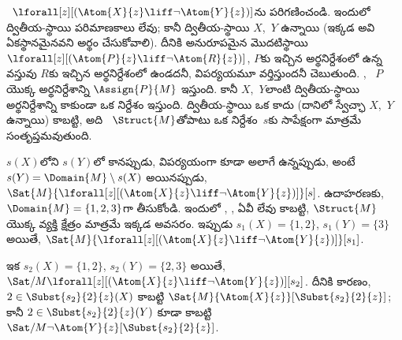 \documentclass[../../../include/open-logic-section]{subfiles}
\begin{document}
\begin{ex}
  ~$\lforall[z][(\Atom{X}{z} \liff \lnot
    \Atom{Y}{z})]$ను పరిగణించండి. ఇందులో ద్వితీయ-స్థాయి పరిమాణకాలు
  లేవు; కానీ ద్వితీయ-స్థాయి  $X$,~$Y$ ఉన్నాయి (ఇక్కడ అవి
  ఏకస్థానమైనవని అర్థం చేసుకోవాలి). దీనికి అనురూపమైన మొదటిస్థాయి
   $\lforall[z][(\Atom{P}{z} \liff \lnot \Atom{R}{z})]$,
$P$కు ఇచ్చిన అర్థనిర్దేశంలో ఉన్న వస్తువు $R$కు ఇచ్చిన అర్థనిర్దేశంలో
ఉండదనీ, విపర్యయమూ వర్తిస్తుందనీ చెబుతుంది.
  , ~$P$ యొక్క అర్థనిర్దేశాన్ని
  $\Assign{P}{M}$ ఇస్తుంది. కానీ $X$,~$Y$లాంటి ద్వితీయ-స్థాయి
   అర్థనిర్దేశాన్ని  కాకుండా ఒక  నిర్దేశం
  ఇస్తుంది. ద్వితీయ-స్థాయి  ఒక  కాదు (దానిలో
  స్వేచ్ఛా  $X$,~$Y$ ఉన్నాయి) కాబట్టి, అది
  ~$\Struct{M}$తోపాటు ఒక  నిర్దేశం~$s$కు
  సాపేక్షంగా మాత్రమే సంతృప్తమవుతుంది.

  $s(X)$లోని  $s(Y)$లో  కానప్పుడు,
  విపర్యయంగా కూడా అలాగే ఉన్నప్పుడు, అంటే $s(Y) = \Domain{M}
  \setminus s(X)$ అయినప్పుడు, $\Sat{M}{\lforall[z][(\Atom{X}{z}
  \liff \lnot \Atom{Y}{z})]}[s]$. ఉదాహరణకు, $\Domain{M} = \{1,
  2, 3\}$గా తీసుకోండి. ఇందులో , ,
   ఏవీ లేవు కాబట్టి, $\Struct{M}$ యొక్క వ్యక్తి క్షేత్రం
  మాత్రమే ఇక్కడ అవసరం. ఇప్పుడు $s_1(X) = \{1, 2\}$,
  $s_1(Y) = \{3\}$ అయితే, $\Sat{M}{\lforall[z][(\Atom{X}{z}
      \liff \lnot \Atom{Y}{z})]}[s_1]$.

ఇక $s_2(X) = \{1, 2\}$, $s_2(Y) = \{2, 3\}$ అయితే,
  $\Sat/{M}{\lforall[z][(\Atom{X}{z} \liff \lnot
      \Atom{Y}{z})]}[s_2]$. దీనికి కారణం,
  $2 \in \Subst{s_2}{2}{z}(X)$ కాబట్టి
  $\Sat{M}{\Atom{X}{z}}[\Subst{s_2}{2}{z}]$; కానీ $2 \in
  \Subst{s_2}{2}{z}(Y)$ కూడా కాబట్టి
  $\Sat/{M}{\lnot \Atom{Y}{z}}[\Subst{s_2}{2}{z}]$.
\end{ex}
\end{document}

